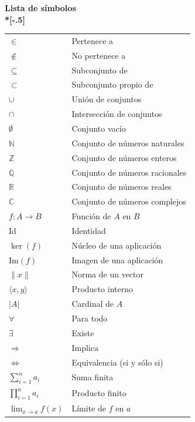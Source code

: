 \documentclass[a4paper,11pt,spanish, twoside]{tfg-uam-matematicas_25-26}
\theoremstyle{definition}
\begin{document}
\cleardoublepage

\begin{flushright}
\Huge\bf Lista de símbolos\\*[-.5\baselineskip]
\hrulefill
\end{flushright}


\begin{tabular}{ll}
$\in$ & Pertenece a \\
$\notin$ & No pertenece a \\
$\subseteq$ & Subconjunto de \\
$\subset$ & Subconjunto propio de \\
$\cup$ & Unión de conjuntos \\
$\cap$ & Intersección de conjuntos \\
$\emptyset$ & Conjunto vacío \\
$\mathbb{N}$ & Conjunto de números naturales \\
$\mathbb{Z}$ & Conjunto de números enteros \\
$\mathbb{Q}$ & Conjunto de números racionales \\
$\mathbb{R}$ & Conjunto de números reales \\
$\mathbb{C}$ & Conjunto de números complejos \\
$f: A \to B$ & Función de $A$ en $B$ \\
$\mathrm{Id}$ & Identidad \\
$\ker(f)$ & Núcleo de una aplicación \\
$\mathrm{Im}(f)$ & Imagen de una aplicación \\
$\|x\|$ & Norma de un vector \\
$\langle x,y \rangle$ & Producto interno \\
$|A|$ & Cardinal de $A$ \\
$\forall$ & Para todo \\
$\exists$ & Existe \\
$\Rightarrow$ & Implica \\
$\Leftrightarrow$ & Equivalencia (si y sólo si) \\
$\sum_{i=1}^n a_i$ & Suma finita \\
$\prod_{i=1}^n a_i$ & Producto finito \\
$\lim_{x \to a} f(x)$ & Límite de $f$ en $a$ \\

\end{tabular}
\end{document}
